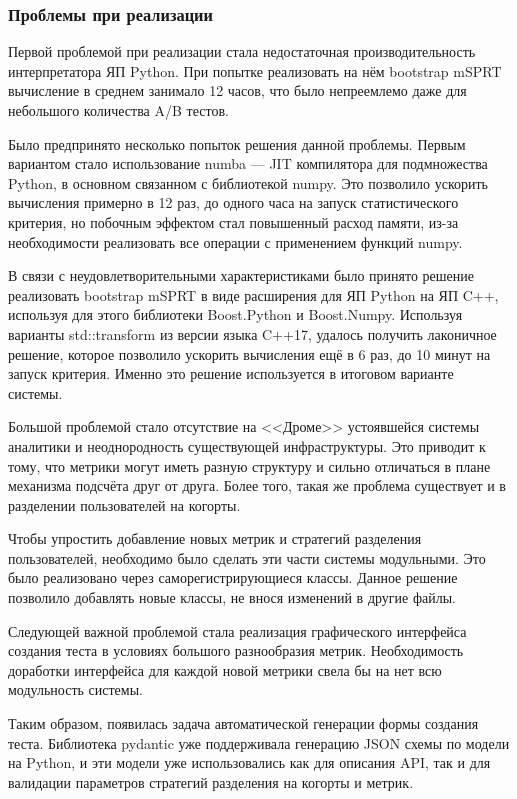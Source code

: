 \documentclass[../document.tex]{subfiles}
\begin{document}
	\subsubsection{Проблемы при реализации}
	\par Первой проблемой при реализации стала недостаточная производительность интерпретатора ЯП Python. При попытке реализовать на нём bootstrap mSPRT вычисление в среднем занимало 12 часов, что было непреемлемо даже для небольшого количества A/B тестов.
	\par Было предпринято несколько попыток решения данной проблемы. Первым вариантом стало использование numba --- JIT компилятора для подмножества Python, в основном связанном с библиотекой numpy. Это позволило ускорить вычисления примерно в 12 раз, до одного часа на запуск статистического критерия, но побочным эффектом стал повышенный расход памяти, из-за необходимости реализовать все операции с применением функций numpy.
	\par В связи с неудовлетворительными характеристиками было принято решение реализовать bootstrap mSPRT в виде расширения для ЯП Python на ЯП C++, используя для этого библиотеки Boost.Python и Boost.Numpy. Используя варианты std::transform из версии языка C++17, удалось получить лаконичное решение, которое позволило ускорить вычисления ещё в 6 раз, до 10 минут на запуск критерия. Именно это решение используется в итоговом варианте системы.
	\par Большой проблемой стало отсутствие на <<Дроме>> устоявшейся системы аналитики и неоднородность существующей инфраструктуры. Это приводит к тому, что метрики могут иметь разную структуру и сильно отличаться в плане механизма подсчёта друг от друга. Более того, такая же проблема существует и в разделении пользователей на когорты.
	\par Чтобы упростить добавление новых метрик и стратегий разделения пользователей, необходимо было сделать эти части системы модульными. Это было реализовано через саморегистрирующиеся классы. Данное решение позволило добавлять новые классы, не внося изменений в другие файлы.
	\par Следующей важной проблемой стала реализация графического интерфейса создания теста в условиях большого разнообразия метрик. Необходимость доработки интерфейса для каждой новой метрики свела бы на нет всю модульность системы.
	\par Таким образом, появилась задача автоматической генерации формы создания теста. Библиотека pydantic уже поддерживала генерацию JSON схемы по модели на Python, и эти модели уже использовались как для описания API, так и для валидации параметров стратегий разделения на когорты и метрик.
\end{document}
